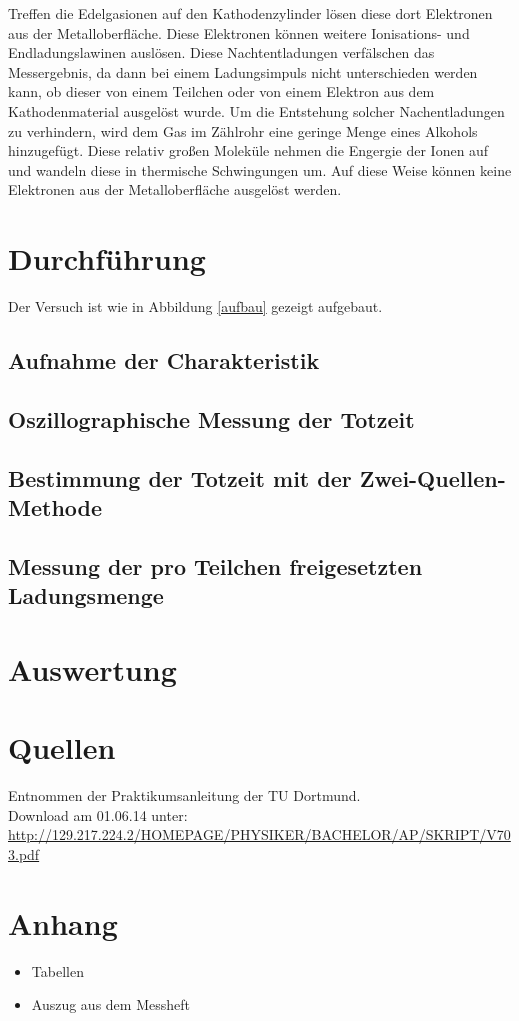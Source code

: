 \documentclass[11pt,ngerman,a4paper]{article}
\begin{document}
\noindent
Treffen die Edelgasionen auf den Kathodenzylinder lösen diese dort Elektronen aus der Metalloberfläche. Diese Elektronen können weitere Ionisations- und Endladungslawinen auslösen. Diese Nachtentladungen verfälschen das Messergebnis, da dann bei einem Ladungsimpuls nicht unterschieden werden kann, ob dieser von einem Teilchen oder von einem Elektron aus dem Kathodenmaterial ausgelöst wurde. Um die Entstehung solcher Nachentladungen zu verhindern, wird dem Gas im Zählrohr eine geringe Menge eines Alkohols hinzugefügt. Diese relativ großen Moleküle nehmen die Engergie der Ionen auf und wandeln diese in thermische Schwingungen um. Auf diese Weise können keine Elektronen aus der Metalloberfläche ausgelöst werden.
\section{Durchführung}
Der Versuch ist wie in Abbildung \ref{aufbau} gezeigt aufgebaut. 
\subsection{Aufnahme der Charakteristik}
\subsection{Oszillographische Messung der Totzeit}
\subsection{Bestimmung der Totzeit mit der Zwei-Quellen-Methode}
\subsection{Messung der pro Teilchen freigesetzten Ladungsmenge}
\section{Auswertung}

\section{Quellen}
\begin{enumerate}[{[}1{]}]
\item Entnommen der Praktikumsanleitung \textit{} der TU Dortmund. \\
Download am 01.06.14 unter:\\
 \url{http://129.217.224.2/HOMEPAGE/PHYSIKER/BACHELOR/AP/SKRIPT/V703.pdf}
\end{enumerate}

\section{Anhang}
\begin{itemize}
\item Tabellen
\item Auszug aus dem Messheft
\end{itemize}
\end{document}
